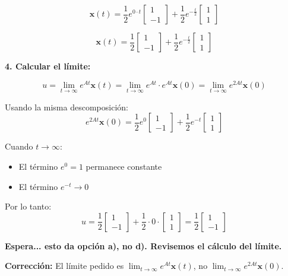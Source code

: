 \begin{solbox}
$$\mathbf{x}(t) = \frac{1}{2}e^{0 \cdot t}\begin{bmatrix}1\\-1\end{bmatrix} + \frac{1}{2}e^{-\frac{t}{2}}\begin{bmatrix}1\\1\end{bmatrix}$$

$$\mathbf{x}(t) = \frac{1}{2}\begin{bmatrix}1\\-1\end{bmatrix} + \frac{1}{2}e^{-\frac{t}{2}}\begin{bmatrix}1\\1\end{bmatrix}$$

\textbf{4. Calcular el límite:}

$$u = \lim_{t\to\infty} e^{At}\mathbf{x}(t) = \lim_{t\to\infty} e^{At} \cdot e^{At}\mathbf{x}(0) = \lim_{t\to\infty} e^{2At}\mathbf{x}(0)$$

Usando la misma descomposición:
$$e^{2At}\mathbf{x}(0) = \frac{1}{2}e^{0}\begin{bmatrix}1\\-1\end{bmatrix} + \frac{1}{2}e^{-t}\begin{bmatrix}1\\1\end{bmatrix}$$

Cuando $t \to \infty$:
\begin{itemize}
    \item El término $e^{0} = 1$ permanece constante
    \item El término $e^{-t} \to 0$
\end{itemize}

Por lo tanto:
$$u = \frac{1}{2}\begin{bmatrix}1\\-1\end{bmatrix} + \frac{1}{2} \cdot 0 \cdot \begin{bmatrix}1\\1\end{bmatrix} = \frac{1}{2}\begin{bmatrix}1\\-1\end{bmatrix}$$

\textbf{Espera... esto da opción a), no d). Revisemos el cálculo del límite.}

\textbf{Corrección:} El límite pedido es $\lim_{t\to\infty} e^{At}\mathbf{x}(t)$, no $\lim_{t\to\infty} e^{2At}\mathbf{x}(0)$.


\end{solbox}
